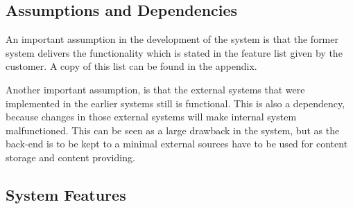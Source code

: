\subsection{Assumptions and Dependencies}

An important assumption in the development of the system is that the former system delivers the functionality which is stated in the feature list given by the customer. A copy of this list can be found in the appendix.

\noindent

Another important assumption, is that the external systems that were implemented in the earlier systems still is functional. This is also a dependency, because changes in those external systems will make internal system malfunctioned. This can be seen as a large drawback in the system, but as the back-end is to be kept to a minimal external sources have to be used for content storage and content providing.

\subsection{System Features}

\clearpage

